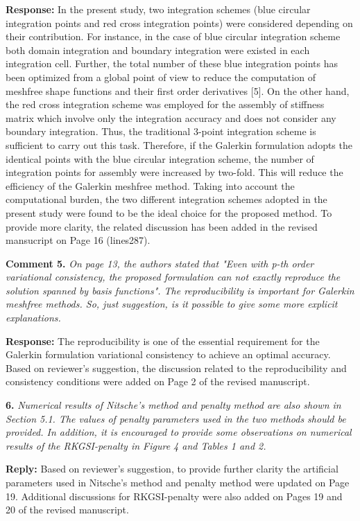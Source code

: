 \documentclass{article}
\begin{document}
\textbf{Response:} In the present study, two integration schemes (blue circular integration points and red cross integration points) were considered depending on their contribution. For instance, in the case of blue circular integration scheme both domain integration and boundary integration were existed in each integration cell. Further, the total number of these blue integration points has been optimized from a global point of view to reduce the computation of meshfree shape functions and their first order derivatives [5]. On the other hand, the red cross integration scheme was employed for the assembly of stiffness matrix which involve only the integration accuracy and does not consider any boundary integration. Thus, the traditional 3-point integration scheme is sufficient to carry out this task. Therefore, if the Galerkin formulation adopts the identical points with the blue circular integration scheme, the number of integration points for assembly were increased by two-fold. This will reduce the efficiency of the Galerkin meshfree method. Taking into account the computational burden, the two different integration schemes adopted in the present study were found to be the ideal choice for the proposed method. To provide more clarity, the related discussion has been added in the revised mansucript on Page 16 (lines287). 

\textbf{Comment 5.} \textit{On page 13, the authors stated that "Even with p-th order variational consistency, the proposed formulation can not exactly reproduce the solution spanned by basis functions". The reproducibility is important for Galerkin meshfree methods. So, just suggestion, is it possible to give some more explicit explanations.}

\textbf{Response:} The reproducibility is one of the essential requirement for the Galerkin formulation variational consistency to achieve an optimal accuracy. Based on reviewer's suggestion, the discussion related to the reproducibility and consistency conditions were added on Page 2 of the revised manuscript.

\textbf{6.} \textit{Numerical results of Nitsche's method and penalty method are also shown in Section 5.1. The values of penalty parameters used in the two methods should be provided. In addition, it is encouraged to provide some observations on numerical results of the RKGSI-penalty in Figure 4 and Tables 1 and 2.}

\textbf{Reply:} Based on reviewer's suggestion, to provide further clarity the artificial parameters used in Nitsche's method and penalty method were updated on Page 19. Additional discussions for RKGSI-penalty were also added on Pages 19 and 20 of the revised manuscript. 
\end{document}
